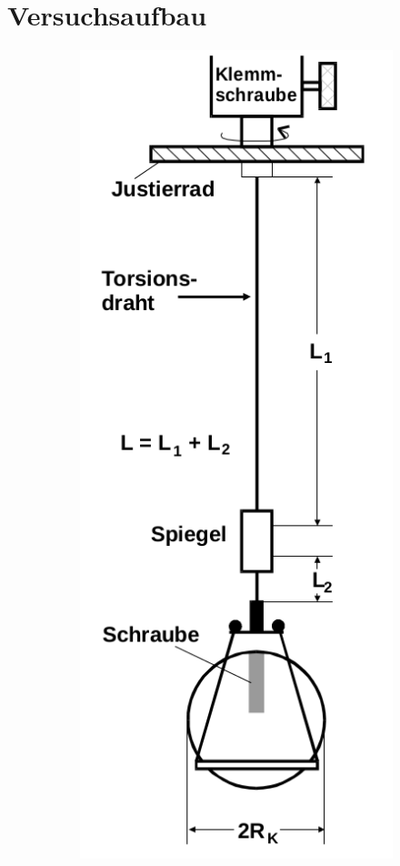 \section{Versuchsaufbau}
\label{sec:Versuchsaufbau}

\begin{figure}
	\centering
	\begin{subfigure}[b]{0.28\textwidth}
		\includegraphics[width=\textwidth]{Bilder/aufbauallgemein.png}

\end{subfigure}
\end{figure}
